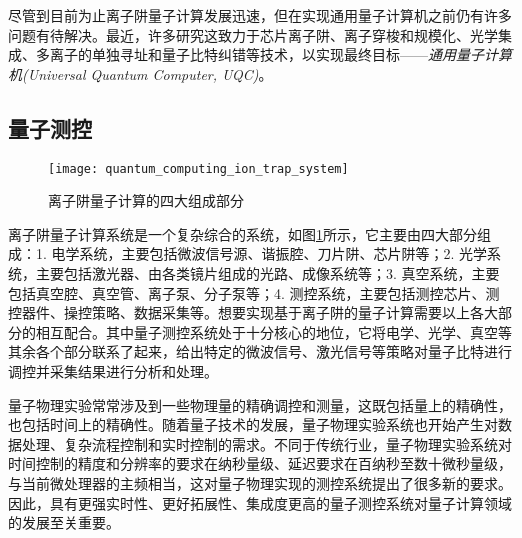 尽管到目前为止离子阱量子计算发展迅速，但在实现通用量子计算机之前仍有许多问题有待解决。最近，许多研究这致力于芯片离子阱\cite[]{Mehta_Eltony_Bruzewicz_Chuang_Ram_Sage_Chiaverini_2014}、离子穿梭和规模化\cite[]{Monroe_Kim_2013, Sterling_Rattanasonti_Weidt_Lake_Srinivasan_Webster_Kraft_Hensinger_2014, Lee_Jeong_Park_Jung_Kim_Cho_2021}、光学集成\cite[]{Niffenegger_Stuart_Sorace_Agaskar_Kharas_Bramhavar_Bruzewicz_Loh_Maxson_McConnell_Reens_et_al_2020, Mehta_Zhang_Malinowski_Nguyen_Stadler_Home_2020}、多离子的单独寻址\cite[]{Ivory_Setzer_Karl_McGuinness_DeRose_Blain_Stick_Gehl_Parazzoli_2020}和量子比特纠错\cite[]{Cramer_Kalb_Rol_Hensen_Blok_Markham_Twitchen_Hanson_Taminiau_2016,Reichardt_2021}等技术，以实现最终目标——\emph{通用量子计算机(Universal Quantum Computer, UQC)}。

\subsection[量子测控]{量子测控}

\begin{figure}
    \centering
    \caption[离子阱量子计算的组成]{离子阱量子计算的四大组成部分\label{fig:quantum_computing_ion_trap_system}}
    \texttt{[image: quantum\_computing\_ion\_trap\_system]}
\end{figure}
离子阱量子计算系统是一个复杂综合的系统，如图\ref{fig:quantum_computing_ion_trap_system}所示，它主要由四大部分组成：1.  电学系统，主要包括微波信号源、谐振腔、刀片阱、芯片阱等；2. 光学系统，主要包括激光器、由各类镜片组成的光路、成像系统等；3. 真空系统，主要包括真空腔、真空管、离子泵、分子泵等；4. 测控系统，主要包括测控芯片、测控器件、操控策略、数据采集等。想要实现基于离子阱的量子计算需要以上各大部分的相互配合。其中量子测控系统处于十分核心的地位，它将电学、光学、真空等其余各个部分联系了起来，给出特定的微波信号、激光信号等策略对量子比特进行调控并采集结果进行分析和处理。

量子物理实验常常涉及到一些物理量的精确调控和测量，这既包括量上的精确性，也包括时间上的精确性。随着量子技术的发展，量子物理实验系统也开始产生对数据处理、复杂流程控制和实时控制的需求。不同于传统行业，量子物理实验系统对时间控制的精度和分辨率的要求在纳秒量级、延迟要求在百纳秒至数十微秒量级，与当前微处理器的主频相当，这对量子物理实现的测控系统提出了很多新的要求。因此，具有更强实时性、更好拓展性、集成度更高的量子测控系统对量子计算领域的发展至关重要。

